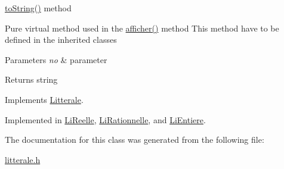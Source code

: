 \hyperlink{class_li_numerique_ad40fe29de93bcf18cc2cd088abcb728b}{to\+String()} method 

Pure virtual method used in the \hyperlink{class_litterale_ae33587fb3c4a929c9ee29d9c6b49aea6}{afficher()} method This method have to be defined in the inherited classes


\begin{DoxyParams}{Parameters}
{\em no} & parameter \\
\hline
\end{DoxyParams}
\begin{DoxyReturn}{Returns}
string 
\end{DoxyReturn}


Implements \hyperlink{class_litterale_a3041839e5494df2c93bff2c5cb83ce1f}{Litterale}.



Implemented in \hyperlink{class_li_reelle_ad78df00afab6b86f6b0ec966f848c872}{Li\+Reelle}, \hyperlink{class_li_rationnelle_a2ef7aa4c19e3433794c251cc61296f58}{Li\+Rationnelle}, and \hyperlink{class_li_entiere_a48fceee2e4f1d481b923ebb28a085baf}{Li\+Entiere}.



The documentation for this class was generated from the following file\+:\begin{DoxyCompactItemize}
\item 
\hyperlink{litterale_8h}{litterale.\+h}\end{DoxyCompactItemize}
